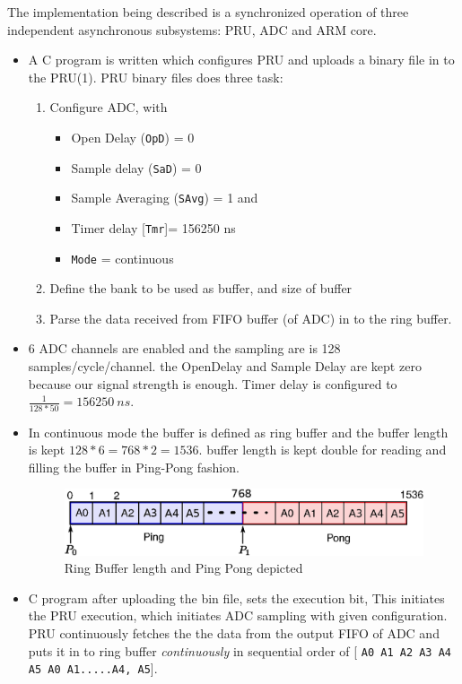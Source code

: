 The implementation being described is a synchronized operation of three independent asynchronous subsystems: PRU, ADC and ARM core.
\begin{itemize}
	\item A C program is written which configures PRU and uploads a binary file in to the PRU(1). PRU binary files does three task:
	\begin{enumerate}
		\item Configure ADC, with 
		\begin{itemize}
			\item Open Delay (\texttt{OpD}) = 0 
			\item Sample delay (\texttt{SaD}) = 0 
			\item Sample Averaging (\texttt{SAvg}) = 1 and 
			\item Timer delay [\texttt{Tmr}]= 156250 ns
			\item \texttt{Mode} = continuous 
		\end{itemize}
		\item Define the bank to be used as buffer, and size of buffer
		\item Parse the data received from FIFO buffer (of ADC) in to the ring buffer. 
	\end{enumerate}
	\item 6 ADC channels are enabled and the sampling are is 128 samples/cycle/channel. the OpenDelay and Sample Delay are kept zero because our signal strength is enough. Timer delay is configured to $ \frac{1}{128 * 50} = 156250 ~ns $.
	\item In continuous mode the buffer is defined as ring buffer and the   buffer length is kept $ 128 * 6 = 768 * 2 = 1536 $. buffer length is kept double for reading and filling the buffer in Ping-Pong fashion.  
	\begin{figure}[h]
		\includegraphics[width=\textwidth]{fig/ring_buffer.eps}
		\caption{Ring Buffer length and Ping Pong depicted}
		\label{fig:rb_pp}
	\end{figure}
	\item C program after uploading the bin file, sets the execution bit, This initiates the PRU execution, which initiates ADC sampling with given configuration. PRU continuously fetches the the data from the output FIFO of ADC and puts it in to ring buffer \textit{continuously} in sequential order of [ \texttt{A0 A1 A2 A3 A4 A5 A0 A1.....A4, A5}].

\end{itemize}
